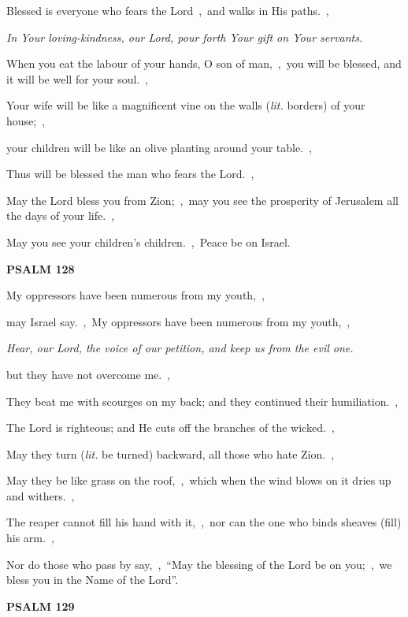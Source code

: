 \documentclass[12pt,twoside,a5paper]{article}
\newcommand{\psalm}[1]{\textbf{PSALM {#1}}\nopagebreak}
\newcommand{\qanona}[1]{{\liturgicalhint{Qanona.} \emph{#1}}}
\newcommand{\translationliteral}[1]{\emph{lit.} #1}
\begin{document}
\begin{normalparskip}
  Blessed is everyone who fears the Lord~\sep\ and walks in His paths.~\sep

  \qanona{In Your loving-kindness, our Lord, pour forth Your gift on Your servants.}

  When you eat the labour of your hands, O son of man,~\sep\ you will be blessed, and it will be well for your soul.~\sep

  Your wife will be like a magnificent vine on the walls (\translationliteral{borders}) of your house;~\sep

  your children will be like an olive planting around your table.~\sep

  Thus will be blessed the man who fears the Lord.~\sep

  May the Lord bless you from Zion;~\sep\ may you see the prosperity of Jerusalem all the days of your life.~\sep

  May you see your children's children.~\sep\ Peace be on Israel.
\end{normalparskip}

\psalm{128}

\begin{normalparskip}
  My oppressors have been numerous from my youth,~\sep

  may Israel say.~\sep\ My oppressors have been numerous from my youth,~\sep

  \qanona{Hear, our Lord, the voice of our petition, and keep us from the evil one.}

  but they have not overcome me.~\sep

  They beat me with scourges on my back; and they continued their humiliation.~\sep

  The Lord is righteous; and He cuts off the branches of the wicked.~\sep

  May they turn (\translationliteral{be turned}) backward, all those who hate Zion.~\sep

  May they be like grass on the roof,~\sep\ which when the wind blows on it dries up and withers.~\sep

  The reaper cannot fill his hand with it,~\sep\ nor can the one who binds sheaves (fill) his arm.~\sep

  Nor do those who pass by say,~\sep\ ``May the blessing of the Lord be on you;~\sep\ we bless you in the Name of the Lord''.
\end{normalparskip}

\psalm{129}
\end{document}
